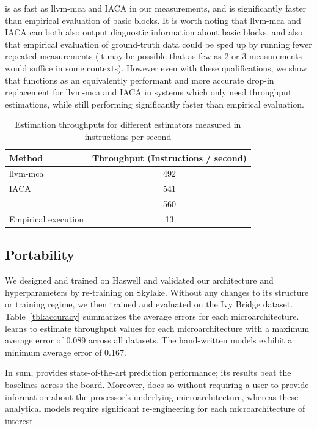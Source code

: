 \tool{} is as fast as llvm-mca and IACA in our measurements, and is significantly faster than empirical evaluation of basic blocks.
It is worth noting that llvm-mca and IACA can both also output diagnostic information about basic blocks, and also that empirical evaluation of ground-truth data could be sped up by running fewer repeated measurements (it may be possible that as few as 2 or 3 measurements would suffice in some contexts).
However even with these qualifications, we show that \tool{} functions as an equivalently performant and more accurate drop-in replacement for llvm-mca and IACA in systems which only need throughput estimations, while still performing significantly faster than empirical evaluation.

\begin{table}[h!]
  \small
  \begin{center}
\begin{tabular}{ |l|c| }
  \hline
  Method & Throughput (Instructions / second)  \\
  \hline
   llvm-mca & 492  \\  %
   IACA & 541  \\ %
   \tool{} & 560 \\ %
   Empirical execution & 13 \\ %
  \hline
\end{tabular}
  \end{center}
  \vspace{-10pt}

  \caption{Estimation throughputs for different estimators measured in instructions per second}
  \label{tbl:speed}
\end{table}

\subsection{Portability}
\label{sec:portability}

We designed and trained \tool{} on Haswell and validated our architecture and hyperparameters by re-training on Skylake.
Without any changes to its structure or training regime, we then trained and evaluated \tool{} on the Ivy Bridge dataset.
Table~\ref{tbl:accuracy} summarizes the average errors for each microarchitecture.
\tool{} learns to estimate throughput values for each microarchitecture with a maximum average error of 0.089 across all datasets.
The hand-written models exhibit a minimum average error of 0.167.

In sum, \tool{} provides state-of-the-art prediction performance; its results beat the baselines across the board.
Moreover, \tool{} does so without requiring a user to provide information about the processor's underlying microarchitecture, whereas these analytical models require significant re-engineering for each microarchitecture of interest.
